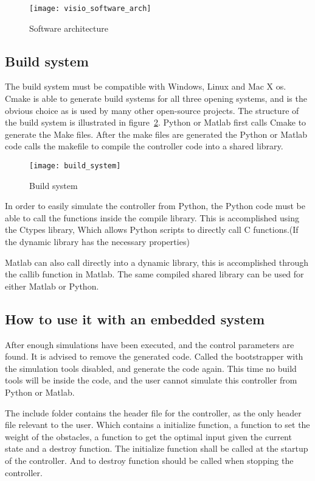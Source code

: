 	\begin{figure}[H]
		\centering
		\texttt{[image: visio\_software\_arch]}
		\caption{Software architecture}
		\label{fig:visio software arch}
	\end{figure}

\subsection{Build system}
The build system must be compatible with Windows, Linux and Mac X os. Cmake is able to generate build systems for all three opening systems, and is the obvious choice as is used by many other open-source projects. The structure of the build system is illustrated in figure~\ref{fig:build system}. Python or Matlab first calls Cmake to generate the Make files. After the make files are generated the Python or Matlab code calls the makefile to compile the controller code into a shared library.
\begin{figure}[H]
	\centering
	\texttt{[image: build\_system]}
	\caption{Build system}
	\label{fig:build system}
\end{figure}
In order to easily simulate the controller from Python, the Python code must be able to call the functions inside the compile library. This is accomplished using the Ctypes library, Which allows Python scripts to directly call C functions.(If the dynamic library has the necessary properties)

Matlab can also call directly into a dynamic library, this is accomplished through the callib function in Matlab. The same compiled shared library can be used for either Matlab or Python.

\subsection{How to use it with an embedded system}
After enough simulations have been executed, and the control parameters are found. It is advised to remove the generated code. Called the bootstrapper with the simulation tools disabled, and generate the code again. This time no build tools will be inside the code, and the user cannot simulate this controller from Python or Matlab.

The include folder contains the header file for the controller, as the only header file relevant to the user. Which contains a initialize function, a function to set the weight of the obstacles, a function to get the optimal input given the current state and a destroy function. The initialize function shall be called at the startup of the controller. And to destroy function should be called when stopping the controller.


